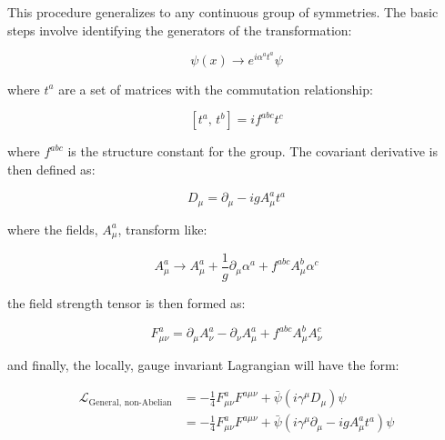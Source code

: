 \par This procedure generalizes to any continuous group of
symmetries.  The basic steps involve identifying the generators of
the transformation:

\begin{equation}\label{eq:yang_mills_general_transformation}
\psi(x) \rightarrow e^{i\alpha^{a}t^{a}} \psi
\end{equation}

\noindent where $t^{a}$ are a set of matrices with the commutation
relationship:

\begin{equation}\label{eq:yang_mills_general_commutator}
[t^{a} \text{, } t^{b}]  = if^{abc}t^{c}
\end{equation}

\noindent where $f^{abc}$ is the structure constant for the group.  The
covariant derivative is then defined as:

\begin{equation}\label{eq:yang_mills_general_covariant_derivative}
D_{\mu} = \partial_{\mu} - igA_{\mu}^{a}t^{a}
\end{equation}

\noindent where the fields, $A_{\mu}^{a}$, transform like:

\begin{equation}\label{eq:yang_mills_general_vector_transformation}
A_{\mu}^{a} \rightarrow A_{\mu}^{a} +
\frac{1}{g}\partial_{\mu}\alpha^{a} + f^{abc}A_{\mu}^{b}\alpha^{c}
\end{equation}

\noindent the field strength tensor is then formed as:

\begin{equation}\label{eq:yang_mills_general_field_strength_tensor}
F_{\mu\nu}^{a} = \partial_{\mu}A_{\nu}^{a} - \partial_{\nu}A_{\mu}^{a}
+ f^{abc}A_{\mu}^{b}A_{\nu}^{c}
\end{equation}

\noindent and finally, the locally, gauge invariant Lagrangian will
have the form:

\begin{equation}\label{eq:yang_mills_general_invariant_lagrangian}
\begin{aligned}
\mathcal{L}_{\text{General, non-Abelian}} & =
  -\frac{1}{4}F_{\mu\nu}^{a}F^{a\mu\nu} +
  \bar{\psi}(i\gamma^{\mu}D_{\mu})\psi \\
& = -\frac{1}{4}F_{\mu\nu}^{a}F^{a\mu\nu} +
  \bar{\psi}(i\gamma^{\mu}\partial_{\mu} - igA_{\mu}^{a}t^{a})\psi 
\end{aligned}
\end{equation}


